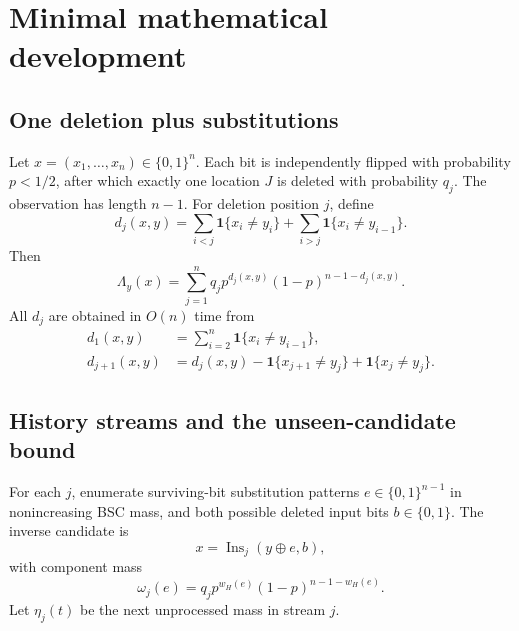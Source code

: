 \documentclass[11pt]{article}
\begin{document}
\section{Minimal mathematical development}

\subsection{One deletion plus substitutions}
Let $x=(x_1,\ldots,x_n)\in\{0,1\}^n$. Each bit is independently flipped with probability $p<1/2$, after which exactly one location $J$ is deleted with probability $q_j$. The observation has length $n-1$. For deletion position $j$, define
\begin{equation}
d_j(x,y)=\sum_{i<j}\mathbf 1\{x_i\ne y_i\}+\sum_{i>j}\mathbf 1\{x_i\ne y_{i-1}\}.
\end{equation}
Then
\begin{equation}
\Lambda_y(x)=\sum_{j=1}^{n}q_j p^{d_j(x,y)}(1-p)^{n-1-d_j(x,y)}.
\label{eq:d1score}
\end{equation}
All $d_j$ are obtained in $O(n)$ time from
\begin{align}
d_1(x,y)&=\sum_{i=2}^{n}\mathbf 1\{x_i\ne y_{i-1}\},\\
d_{j+1}(x,y)&=d_j(x,y)-\mathbf 1\{x_{j+1}\ne y_j\}+\mathbf 1\{x_j\ne y_j\}.
\end{align}

\subsection{History streams and the unseen-candidate bound}
For each $j$, enumerate surviving-bit substitution patterns $e\in\{0,1\}^{n-1}$ in nonincreasing BSC mass, and both possible deleted input bits $b\in\{0,1\}$. The inverse candidate is
\begin{equation}
x=\operatorname{Ins}_j(y\oplus e,b),
\end{equation}
with component mass
\begin{equation}
\omega_j(e)=q_jp^{w_H(e)}(1-p)^{n-1-w_H(e)}.
\end{equation}
Let $\eta_j(t)$ be the next unprocessed mass in stream $j$.
\end{document}
